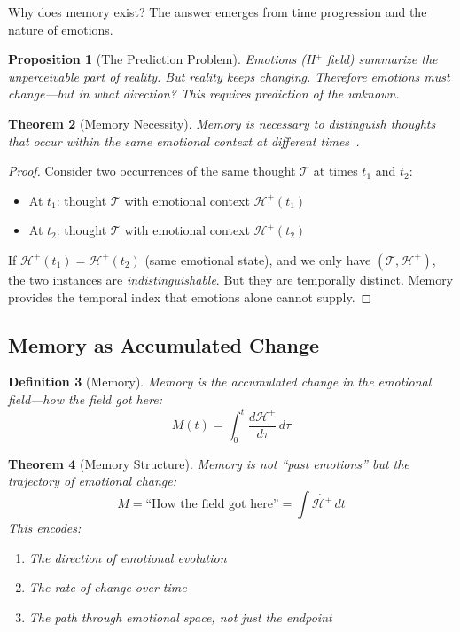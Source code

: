 \documentclass[aps,prd,twocolumn,superscriptaddress,floatfix,nofootinbib]{revtex4-2}
\newtheorem{theorem}{Theorem}[section]
\newtheorem{definition}[theorem]{Definition}
\newtheorem{proposition}[theorem]{Proposition}
\theoremstyle{remark}
\newcommand{\Tcat}{\mathcal{T}}
\newcommand{\Hfield}{\mathcal{H}^+}
\begin{document}
Why does memory exist? The answer emerges from time progression and the nature of emotions.

\begin{proposition}[The Prediction Problem]
\label{prop:prediction}
Emotions (H$^+$ field) summarize the unperceivable part of reality. But reality keeps changing. Therefore emotions must change---but in what direction? This requires prediction of the unknown.
\end{proposition}

\begin{theorem}[Memory Necessity]
\label{thm:memory_necessity}
Memory is necessary to distinguish thoughts that occur within the \emph{same} emotional context at \emph{different} times~\cite{tulving1972episodic,squire2004memory}.
\end{theorem}

\begin{proof}
Consider two occurrences of the same thought $\Tcat$ at times $t_1$ and $t_2$:
\begin{itemize}
\item At $t_1$: thought $\Tcat$ with emotional context $\Hfield(t_1)$
\item At $t_2$: thought $\Tcat$ with emotional context $\Hfield(t_2)$
\end{itemize}
If $\Hfield(t_1) = \Hfield(t_2)$ (same emotional state), and we only have $(\Tcat, \Hfield)$, the two instances are \emph{indistinguishable}. But they are temporally distinct. Memory provides the temporal index that emotions alone cannot supply.
\end{proof}

\subsection{Memory as Accumulated Change}

\begin{definition}[Memory]
\label{def:memory}
Memory is the accumulated change in the emotional field---how the field \emph{got here}:
\begin{equation}
\boxed{M(t) = \int_0^t \frac{d\Hfield}{d\tau} \, d\tau}
\end{equation}
\end{definition}

\begin{theorem}[Memory Structure]
\label{thm:memory}
Memory is not ``past emotions'' but the \emph{trajectory of emotional change}:
\begin{equation}
M = \text{``How the field got here''} = \int \dot{\Hfield} \, dt
\end{equation}
This encodes:
\begin{enumerate}
\item The direction of emotional evolution
\item The rate of change over time
\item The path through emotional space, not just the endpoint
\end{enumerate}
\end{theorem}
\end{document}
